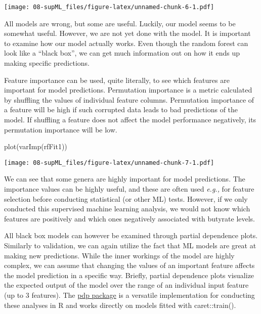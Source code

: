 \documentclass[
  oneside]{book}
\newenvironment{Shaded}{\begin{snugshade}}{\end{snugshade}}
\newcommand{\FunctionTok}[1]{\textcolor[rgb]{0.00,0.00,0.00}{#1}}
\newcommand{\NormalTok}[1]{#1}
\begin{document}
\texttt{[image: 08-supML\_files/figure-latex/unnamed-chunk-6-1.pdf]}

All models are wrong, but some are useful. Luckily, our model seems to be somewhat useful.
However, we are not yet done with the model. It is important to examine how our model
actually works. Even though the random forest can look like a ``black box'', we can get
much information out on how it ends up making specific predictions.

Feature importance can be used, quite literally, to see which features are important
for model predictions. Permutation importance is a metric calculated by shuffling the
values of individual feature columns. Permutation importance of a feature will be high
if such corrupted data leads to bad predictions of the model. If shuffling a feature
does not affect the model performance negatively, its permutation importance will be low.

\begin{Shaded}
\begin{Highlighting}[]
\FunctionTok{plot}\NormalTok{(}\FunctionTok{varImp}\NormalTok{(rfFit1))}
\end{Highlighting}
\end{Shaded}

\texttt{[image: 08-supML\_files/figure-latex/unnamed-chunk-7-1.pdf]}

We can see that some genera are highly important for model predictions. The importance
values can be highly useful, and these are often used \emph{e.g.,} for feature selection before
conducting statistical (or other ML) tests. However, if we only conducted this supervised
machine learning analysis, we would not know which features are positively and which
ones negatively associated with butyrate levels.

All black box models can however be examined through partial dependence plots. Similarly to
validation, we can again utilize the fact that ML models are great at making new predictions.
While the inner workings of the model are highly complex, we can assume that changing
the values of an important feature affects the model prediction in a specific way.
Briefly, partial dependence plots visualize the expected output of the model over the
range of an individual input feature (up to 3 features). The \href{https://bgreenwell.github.io/pdp/articles/pdp.html}{pdp package}
is a versatile implementation for conducting these analyses in R and works directly on models
fitted with caret::train().
\end{document}
